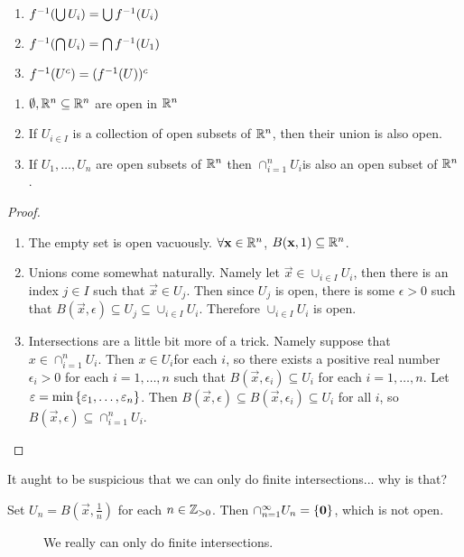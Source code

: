 \documentclass[12pt, twosided]{article}
\begin{document}
\begin{enumerate}
\item \(f^{-1}(\bigcup U_i) = \bigcup f^{-1}(U_i)\)
\item \(f^{-1}(\bigcap U_i) = \bigcap f^{-1}(U_1)\)
\item \(f^{-1}(U^c) = (f^{-1}(U))^c\)
\end{enumerate}

\begin{prop}
  \begin{enumerate}
  \item \(\emptyset, \mathbb{R}^n \subseteq \mathbb{R}^n\) are open in \(\mathbb{R}^n\)
  \item If \({U}_{i\in I}\) is a collection of open subsets of \(\mathbb{R}^n\), then their union is also open.
  \item If \(U_1,\ldots, U_n\) are open subsets of \(\mathbb{R}^n\) then \(\cap_{i=1}^nU_i\)is also an open subset of \(\mathbb{R}^n\).
  \end{enumerate}
\end{prop}
\begin{proof}
  \begin{enumerate}
  \item The empty set is open vacuously.
    \(\forall \mathbf{x} \in \mathbb{R}^n\), \(B(\mathbf{x}, 1) \subseteq \mathbb{R}^n\). 
  \item Unions come somewhat naturally. Namely let \(\vec{x} \in \cup_{i \in I}U_i\), then there is an index \(j \in I\) such that \(\vec{x} \in U_j\). Then since \(U_j\) is open, there is some \(\epsilon > 0\) such that \(B(\vec{x}, \epsilon) \subseteq U_j \subseteq \cup_{i \in I} U_i\). Therefore \(\cup_{i \in I} U_i\) is open.
  \item Intersections are a little bit more of a trick. Namely suppose that \(x \in \cap_{i = 1}^n U_i\). Then \(x \in U_i\)for each \(i\), so there exists a positive real number \(\epsilon_i > 0\)  for each \(i = 1, \ldots, n\) such that \(B(\vec{x}, \epsilon_i) \subseteq U_i\) for each \(i = 1, \ldots, n\). Let \(\varepsilon = \min\left\{ \varepsilon_1, \ldots, \varepsilon_n \right\}\). Then \(B(\vec{x}, \epsilon) \subseteq B(\vec{x}, \epsilon_i) \subseteq U_i\) for all \(i\), so \(B(\vec{x}, \epsilon) \subseteq \cap_{i = 1}^n U_i\).
  \end{enumerate}
\end{proof}
It aught to be suspicious that we can only do finite intersections... why is that?
\begin{exa}
  Set \(U_n = B(\vec{x}, \frac{1}{n})\) for each \(n \in \mathbb{Z}_{>0}\).
  Then \(\cap_{n = 1}^{\infty} U_n = \left\{ \mathbf{0} \right\}\), which is not open.
  \begin{figure}[h]
    \centering
    
    \caption[Concentric Circles]{We really can only do finite intersections.}
    \label{fig:FinInt}
  \end{figure}
\end{exa}
\end{document}
